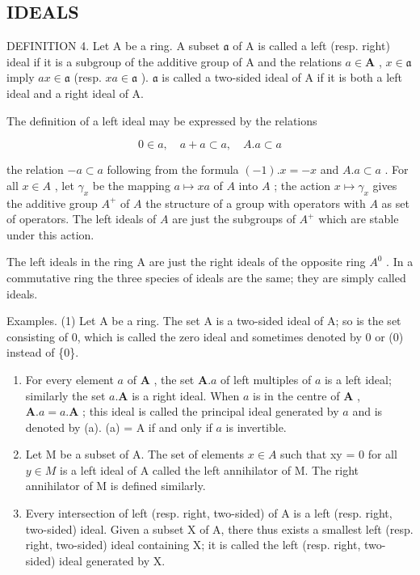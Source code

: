 \subsection{IDEALS}

DEFINITION 4. Let A be a ring. A subset \(\mathfrak{a}\) of A is called a left (resp. right) ideal if it is a subgroup of the additive group of A and the relations \(a \in \mathbf{A}\) , \(x \in \mathfrak{a}\) imply \(ax \in \mathfrak{a}\) (resp. \(xa \in \mathfrak{a}\) ). \(\mathfrak{a}\) is called a two-sided ideal of A if it is both a left ideal and a right ideal of A.

The definition of a left ideal may be expressed by the relations

\[
0 \in a, \quad a + a \subset a, \quad A. a \subset a
\]

the relation \(-a \subset a\) following from the formula \((-1).x = -x\) and \(A.a \subset a\) . For all \(x \in A\) , let \(\gamma_x\) be the mapping \(a \mapsto xa\) of \(A\) into \(A\) ; the action \(x \mapsto \gamma_x\) gives the additive group \(A^+\) of \(A\) the structure of a group with operators with \(A\) as set of operators. The left ideals of \(A\) are just the subgroups of \(A^+\) which are stable under this action.

The left ideals in the ring A are just the right ideals of the opposite ring \(A^{0}\) . In a commutative ring the three species of ideals are the same; they are simply called ideals.

Examples. (1) Let A be a ring. The set A is a two-sided ideal of A; so is the set consisting of 0, which is called the zero ideal and sometimes denoted by 0 or (0) instead of \{0\}.

\begin{enumerate}
\def\labelenumi{(\arabic{enumi})}
\setcounter{enumi}{1}
\item
  For every element \(a\) of \(\mathbf{A}\) , the set \(\mathbf{A}.a\) of left multiples of \(a\) is a left ideal; similarly the set \(a.\mathbf{A}\) is a right ideal. When \(a\) is in the centre of \(\mathbf{A}\) , \(\mathbf{A}.a = a.\mathbf{A}\) ; this ideal is called the principal ideal generated by \(a\) and is denoted by (a). (a) = A if and only if \(a\) is invertible.
\item
  Let M be a subset of A. The set of elements \(x \in A\) such that xy = 0 for all \(y \in M\) is a left ideal of A called the left annihilator of M. The right annihilator of M is defined similarly.
\item
  Every intersection of left (resp. right, two-sided) of A is a left (resp. right, two-sided) ideal. Given a subset X of A, there thus exists a smallest left (resp. right, two-sided) ideal containing X; it is called the left (resp. right, two-sided) ideal generated by X.
\end{enumerate}

